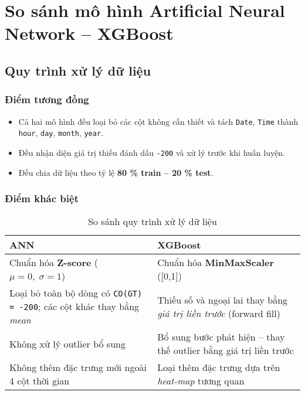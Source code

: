 \section{So sánh mô hình Artificial Neural Network – XGBoost}

\subsection{Quy trình xử lý dữ liệu}

\subsubsection{Điểm tương đồng}
\begin{itemize}
  \item Cả hai mô hình đều loại bỏ các cột không cần thiết và tách \texttt{Date}, \texttt{Time} thành \texttt{hour}, \texttt{day}, \texttt{month}, \texttt{year}.
  \item Đều nhận diện giá trị thiếu đánh dấu \texttt{-200} và xử lý trước khi huấn luyện.
  \item Đều chia dữ liệu theo tỷ lệ \textbf{80 \% train – 20 \% test}.
\end{itemize}

\subsubsection{Điểm khác biệt}

\begin{table}[H]
\centering
\caption{So sánh quy trình xử lý dữ liệu}
\begin{tabular}{p{7cm}|p{7cm}}
\toprule
\textbf{ANN} & \textbf{XGBoost} \\
\midrule
Chuẩn hóa \textbf{Z-score} ($\mu=0,\;\sigma=1$) & Chuẩn hóa \textbf{MinMaxScaler} ([0,1]) \\
\midrule
Loại bỏ toàn bộ dòng có \texttt{CO(GT) = -200}; các cột khác thay bằng \emph{mean} & Thiếu số và ngoại lai thay bằng \emph{giá trị liền trước} (forward fill) \\
\midrule
Không xử lý outlier bổ sung & Bổ sung bước phát hiện – thay thế outlier bằng giá trị liền trước \\
\midrule
Không thêm đặc trưng mới ngoài 4 cột thời gian & Loại thêm đặc trưng dựa trên \emph{heat-map} tương quan \\
\bottomrule
\end{tabular}
\end{table}


